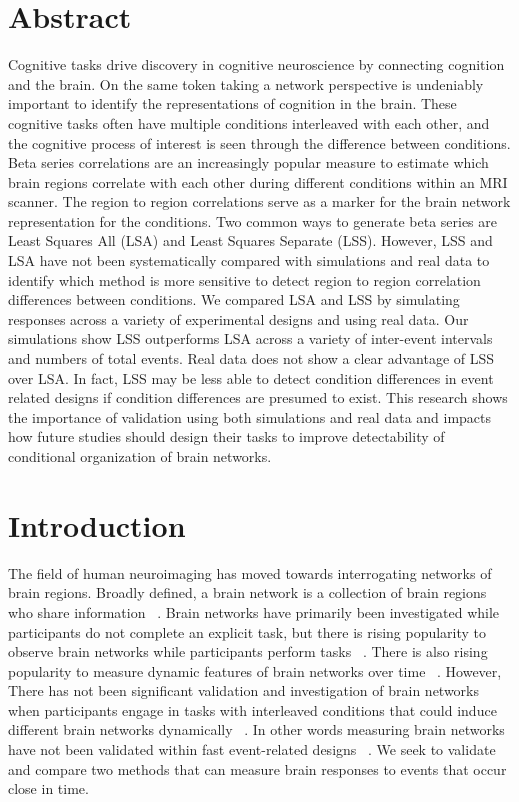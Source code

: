 \documentclass[10pt,letterpaper]{article}
\begin{document}
\section*{Abstract}
Cognitive tasks drive discovery in cognitive neuroscience by connecting cognition and the brain.
On the same token taking a network perspective is undeniably important to identify the
representations of cognition in the brain.
These cognitive tasks often have multiple conditions interleaved with each other,
and the cognitive process of interest is seen through the difference between conditions.
Beta series correlations are an increasingly popular measure to estimate which brain regions correlate with
each other during different conditions within an MRI scanner.
The region to region correlations serve as a marker for the brain network representation
for the conditions.
Two common ways to generate beta series are Least Squares All (LSA) and
Least Squares Separate (LSS).
However, LSS and LSA have not been systematically compared with simulations and real data
to identify which method is more sensitive to detect region to region correlation differences
between conditions.
We compared LSA and LSS by simulating responses across a variety of
experimental designs and using real data.
Our simulations show LSS outperforms LSA across a variety of inter-event
intervals and numbers of total events.
Real data does not show a clear advantage of LSS over LSA.
In fact, LSS may be less able to detect condition differences in
event related designs if condition differences are presumed to exist.
This research shows the importance of validation using both simulations
and real data and impacts how future studies should design their tasks
to improve detectability of conditional organization of brain networks.

\linenumbers

\section*{Introduction}
\label{intro}

The field of human neuroimaging has moved towards interrogating networks of brain regions.
Broadly defined, a brain network is a collection of brain regions who share information ~\cite{Uddin2019}.
Brain networks have primarily been investigated while participants do not complete an explicit task, but there
is rising popularity to observe brain networks while participants perform tasks ~\cite{Cole2014a}.
There is also rising popularity to measure dynamic features of brain networks over time ~\cite{Sakoglu2008,Hindriks2016}.
However, There has not been significant validation and investigation of brain networks
when participants engage in tasks with interleaved conditions that could induce
different brain networks dynamically ~\cite{Di2019a}.
In other words measuring brain networks have not been validated within fast event-related designs ~\cite{Buckner1998}.
We seek to validate and compare two methods that can measure brain responses to events that occur
close in time.
\end{document}
